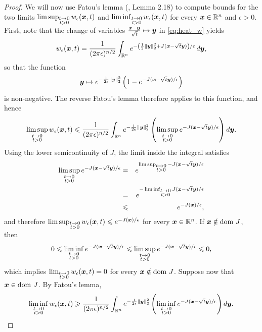 \begin{proof}
We will now use Fatou's lemma (\citep{folland2013real}, Lemma 2.18) to compute bounds for the two limits $\limsup_{\substack{t\to0\\t>0}}w_{\epsilon}(\boldsymbol{x},t)$ and $\liminf_{\substack{t\to0\\t>0}}w_{\epsilon}(\boldsymbol{x},t)$ for every $\boldsymbol{x}\in\mathbb{R}^n$ and $\epsilon>0$. First, note that the change of variables $\frac{\boldsymbol{x}-\boldsymbol{y}}{\sqrt{t}}\mapsto\boldsymbol{y}$ in \eqref{eq:heat_w} yields
\[
w_{\epsilon}(\boldsymbol{x},t)=\frac{1}{(2\pi\epsilon)^{n/2}}\int_{\mathbb{R}^n}e^{-\left(\frac{1}{2}\left\Vert \boldsymbol{y}\right\Vert _{2}^{2}+J(\boldsymbol{x}-\sqrt{t}\boldsymbol{y})\right)/\epsilon}\mathop{}\!d\boldsymbol{y},
\]
so that the function
\[
\boldsymbol{y}\mapsto e^{-\frac{1}{2\epsilon}\left\Vert y\right\Vert _{2}^{2}}\left(1-e^{-J(\boldsymbol{x}-\sqrt{t}\boldsymbol{y})/\epsilon}\right)
\]
is non-negative. The reverse Fatou's lemma therefore applies to this function, and hence
\[
\limsup_{\substack{t\to0\\t>0}}w_{\epsilon}(\boldsymbol{x},t)\leqslant\frac{1}{(2\pi\epsilon)^{n/2}}\int_{\mathbb{R}^n}e^{-\frac{1}{2\epsilon}\left\Vert \boldsymbol{y}\right\Vert _{2}^{2}}\left(\limsup_{\substack{t\to0\\t>0}}e^{-J(\boldsymbol{x}-\sqrt{t}\boldsymbol{y})/\epsilon}\right)\mathop{}\!d\boldsymbol{y}.
\]
Using the lower semicontinuity of $J$, the limit inside the integral satisfies
\begin{eqnarray*}
\limsup_{\substack{t\to0\\t>0}}e^{-J(\boldsymbol{x}-\sqrt{t}\boldsymbol{y})/\epsilon} & = & e^{\limsup_{\substack{t\to0\\t>0}}-J(\boldsymbol{x}-\sqrt{t}\boldsymbol{y})/\epsilon}\\
& = & e^{-\liminf_{\substack{t\to0\\t>0}}J(\boldsymbol{x}-\sqrt{t}\boldsymbol{y})/\epsilon}\\
& \leqslant & e^{-J(\boldsymbol{x})/\epsilon},
\end{eqnarray*}
and therefore $\limsup_{\substack{t\to0\\t>0}}w_{\epsilon}(\boldsymbol{x},t)\leqslant e^{-J(\boldsymbol{x})/\epsilon}$ for every $\boldsymbol{x}\in\mathbb{R}^n$. If $\boldsymbol{x}\notin\mathrm{dom~} J$, then
\[
0\leqslant\liminf_{\substack{t\to0\\t>0}}e^{-J(\boldsymbol{x}-\sqrt{t}\boldsymbol{y})/\epsilon}\leqslant\limsup_{\substack{t\to0\\t>0}}e^{-J(\boldsymbol{x}-\sqrt{t}\boldsymbol{y})/\epsilon}\leqslant0,
\]
which implies $\lim_{\substack{t\to0\\t>0}}w_{\epsilon}(\boldsymbol{x},t)=0$ for every $\boldsymbol{x}\notin\mathrm{dom~} J$. Suppose now that $\boldsymbol{x}\in\mathrm{dom~} J$. By Fatou's lemma, 
\[
\liminf_{\substack{t\to0\\t>0}}w_{\epsilon}(\boldsymbol{x},t)\geqslant\frac{1}{(2\pi\epsilon)^{n/2}}\int_{\mathbb{R}^n}e^{-\frac{1}{2\epsilon}\left\Vert \boldsymbol{y}\right\Vert _{2}^{2}}\left(\liminf_{\substack{t\to0\\t>0}}e^{-J(\boldsymbol{x}-\sqrt{t}\boldsymbol{y})/\epsilon}\right)\mathop{}\!d\boldsymbol{y}.
\]
\end{proof}
